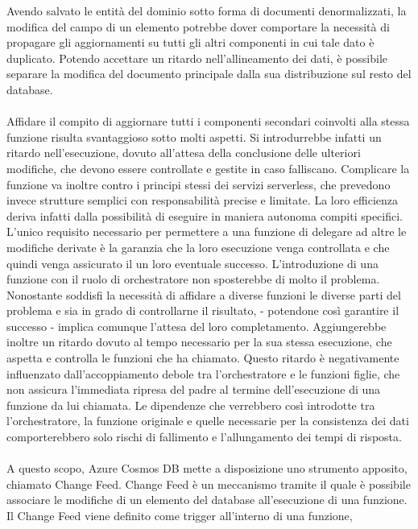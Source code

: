 Avendo salvato le entità del dominio sotto forma di documenti denormalizzati,
la modifica del campo di un elemento potrebbe dover comportare
la necessità di propagare gli aggiornamenti 
su tutti gli altri componenti in cui tale dato è duplicato.
Potendo accettare un ritardo nell'allineamento dei dati,
è possibile separare la modifica del documento principale
dalla sua distribuzione sul resto del database.\\
\\
Affidare il compito di aggiornare tutti i componenti secondari coinvolti
alla stessa funzione risulta svantaggioso sotto molti aspetti.
Si introdurrebbe infatti un ritardo nell'esecuzione,
dovuto all'attesa della conclusione delle ulteriori modifiche,
che devono essere controllate e gestite in caso falliscano.
Complicare la funzione va inoltre contro
i principi stessi dei servizi serverless,
che prevedono invece strutture semplici con responsabilità precise e limitate.
La loro efficienza deriva infatti dalla possibilità
di eseguire in maniera autonoma compiti specifici.
L'unico requisito necessario per permettere a una funzione
di delegare ad altre le modifiche derivate
è la garanzia che la loro esecuzione venga controllata e
che quindi venga assicurato il un loro eventuale successo.
\clearpage
L'introduzione di una funzione con il ruolo di orchestratore
non sposterebbe di molto il problema.
Nonostante soddisfi la necessità di affidare a diverse funzioni
le diverse parti del problema e sia in grado di controllarne il risultato,
- potendone così garantire il successo -
implica comunque l'attesa del loro completamento.
Aggiungerebbe inoltre un ritardo dovuto al tempo necessario per la sua stessa esecuzione,
che aspetta e controlla le funzioni che ha chiamato.
Questo ritardo è negativamente influenzato dall'accoppiamento debole
tra l'orchestratore e le funzioni figlie,
che non assicura l'immediata ripresa del padre 
al termine dell'esecuzione di una funzione da lui chiamata.
Le dipendenze che verrebbero così introdotte tra 
l'orchestratore, la funzione originale e quelle necessarie per la consistenza dei dati
comporterebbero solo rischi di fallimento e l'allungamento dei tempi di risposta.\\
\\
A questo scopo,
Azure Cosmos DB mette a disposizione uno strumento apposito, chiamato Change Feed.
Change Feed è un meccanismo tramite il quale è possibile
associare le modifiche di un elemento del database
all'esecuzione di una funzione.
Il Change Feed viene definito come trigger all'interno di una funzione,
